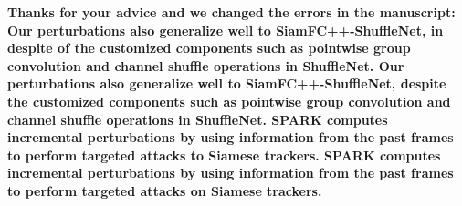 \documentclass[12pt]{article}
\begin{document}
\textbf{
Thanks for your advice and we changed the errors in the manuscript:
Our perturbations also generalize well to SiamFC++-ShuffleNet, in despite of the customized components such as pointwise group convolution and channel shuffle operations in ShuffleNet.
Our perturbations also generalize well to SiamFC++-ShuffleNet, despite the customized components such as pointwise group convolution and channel shuffle operations in ShuffleNet.
SPARK computes incremental perturbations by using information from the past frames to perform targeted attacks to Siamese trackers.
SPARK computes incremental perturbations by using information from the past frames to perform targeted attacks on Siamese trackers.}



\end{document}
